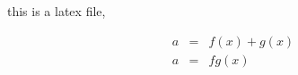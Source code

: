 this is a latex file, 


\begin{align}
a & = & f(x)+g(x) \nonumber\\
a & = & fg(x)
\end{align}

\enddocument
